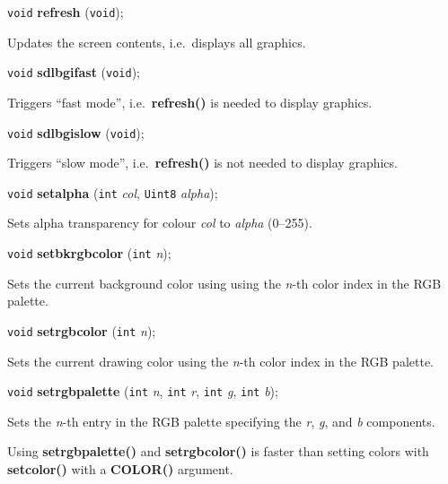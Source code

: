 \documentclass[a4paper,11pt]{article}
\newcommand{\V}{\texttt{void}}      %
\newcommand{\I}{\texttt{int}}       %
\newcommand{\U}{\texttt{Uint8}}     %
\newcommand{\func}[1]{\textbf{#1}}  %
\newcommand{\A}[1]{\emph{#1}}       %
\newenvironment{bgi}
{ %
  \begin{snugshade}
}
{ %
  \end{snugshade}
}
\begin{document}

\begin{bgi}
\V{} \func{refresh} (\V{}); 
\end{bgi}

Updates the screen contents, i.e.\ displays all graphics.


\begin{bgi}
\V{} \func{sdlbgifast} (\V{}); 
\end{bgi}

Triggers ``fast mode'', i.e.\ \func{refresh()} is needed to display
graphics.


\begin{bgi}
\V{} \func{sdlbgislow} (\V{}); 
\end{bgi}

Triggers ``slow mode'', i.e.\ \func{refresh()} is not needed to
display graphics.


\begin{bgi}
\V{} \func{setalpha} (\I{} \A{col}, \U{} \A{alpha}); 
\end{bgi}

Sets alpha transparency for colour \A{col} to \A{alpha} (0--255).



\begin{bgi}
\V{} \func{setbkrgbcolor} (\I{} \A{n}); 
\end{bgi}

Sets the current background color using using the \A{n}-th color index
in the RGB palette.


\begin{bgi}
\V{} \func{setrgbcolor} (\I{} \A{n}); 
\end{bgi}

Sets the current drawing color using the \A{n}-th color index in the
RGB palette.


\begin{bgi}
\V{} \func{setrgbpalette} (\I{} \A{n}, \I{} \A{r}, \I{} \A{g}, \I{} \A{b}); 
\end{bgi}

Sets the \A{n}-th entry in the RGB palette specifying the \A{r},
\A{g}, and \A{b} components.

Using \func{setrgbpalette()} and \func{setrgbcolor()} is faster than
setting colors with \func{setcolor()} with a \func{COLOR()} argument.
\end{document}
